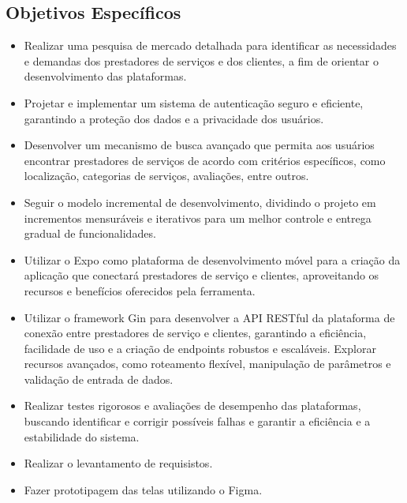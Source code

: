 \subsection{Objetivos Específicos}
\begin{itemize}
  \item Realizar uma pesquisa de mercado detalhada para identificar as necessidades e demandas dos prestadores de serviços e dos clientes, a fim de orientar o desenvolvimento das plataformas.
  \item Projetar e implementar um sistema de autenticação seguro e eficiente, garantindo a proteção dos dados e a privacidade dos usuários.
  \item Desenvolver um mecanismo de busca avançado que permita aos usuários encontrar prestadores de serviços de acordo com critérios específicos, como localização, categorias de serviços, avaliações, entre outros.
  \item Seguir o modelo incremental de desenvolvimento, dividindo o projeto em incrementos mensuráveis e iterativos para um melhor controle e entrega gradual de funcionalidades.
  \item Utilizar o Expo como plataforma de desenvolvimento móvel para a criação da aplicação que conectará prestadores de serviço e clientes, aproveitando os recursos e benefícios oferecidos pela ferramenta.
  \item Utilizar o framework Gin para desenvolver a API RESTful da plataforma de conexão entre prestadores de serviço e clientes, garantindo a eficiência, facilidade de uso e a criação de endpoints robustos e escaláveis. Explorar recursos avançados, como roteamento flexível, manipulação de parâmetros e validação de entrada de dados.
  \item Realizar testes rigorosos e avaliações de desempenho das plataformas, buscando identificar e corrigir possíveis falhas e garantir a eficiência e a estabilidade do sistema.
  \item Realizar o levantamento de requisistos.
  \item Fazer prototipagem das telas utilizando o Figma.
\end{itemize}
